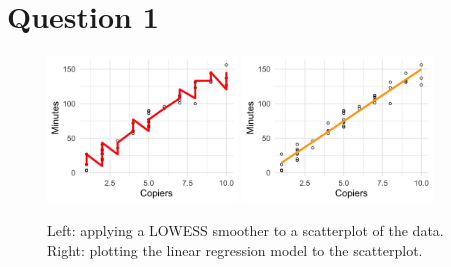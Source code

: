 \documentclass[10pt]{article}
\begin{document}
\section{Question 1} \noindent
\begin{figure}[h]
    \centering
    \includegraphics[width = 0.45\textwidth]{../img/q01_lowess.png}
    \includegraphics[width = 0.45\textwidth]{../img/q01_linear.png}
    \caption{Left: applying a LOWESS smoother to a scatterplot of the data. Right: 
    plotting the linear regression model to the scatterplot.}
    \label{q01_fig}
\end{figure} 
\end{document}
